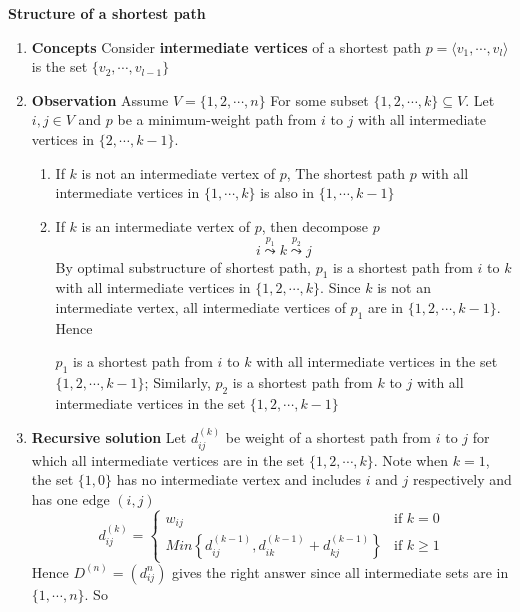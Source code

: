\documentclass[11pt]{article}
\begin{document}
\begin{defn*}
    \textbf{Structure of a shortest path} 
    \begin{enumerate}
        \item \textbf{Concepts} Consider \textbf{intermediate vertices} of a shortest path $p = \langle v_1, \cdots, v_l \rangle$ is the set $\{ v_2,\cdots, v_{l-1}\}$
        \item \textbf{Observation} Assume $V = \{ 1, 2, \cdots, n\}$ For some subset $\{ 1, 2, \cdots, k\}\subseteq V$. Let $i,j \in V$ and $p$ be a minimum-weight path from $i$ to $j$ with all intermediate vertices in $\{ 2, \cdots, k-1\}$. 
        \begin{enumerate}
            \item If $k$ is not an intermediate vertex of $p$, The shortest path $p$ with all intermediate vertices in $\{ 1, \cdots, k\}$ is also in $\{ 1, \cdots, k-1\}$
            \item If $k$ is an intermediate vertex of $p$, then decompose $p$
            \[
                i\overset{p_1}{\leadsto} k \overset{p_2}{\leadsto} j
            \]
            By optimal substructure of shortest path, $p_1$ is a shortest path from $i$ to $k$ with all intermediate vertices in $\{ 1, 2, \cdots, k \}$. Since $k$ is not an intermediate vertex, all intermediate vertices of $p_1$ are in $\{1,2,\cdots, k-1  \}$. Hence 
            \begin{center}
                $p_1$ is a shortest path from $i$ to $k$ with all intermediate vertices in the set $\{ 1,2,\cdots, k-1 \}$; Similarly, $p_2$ is a shortest path from $k$ to $j$ with all intermediate vertices in the set $\{ 1,2,\cdots, k-1 \}$
            \end{center}
        \end{enumerate}
        \item \textbf{Recursive solution} Let $d_{ij}^{(k)}$ be weight of a shortest path from $i$ to $j$ for which all intermediate vertices are in the set $\{1,2,\cdots, k \}$. Note when $k=1$, the set $\{ 1, 0 \}$ has no intermediate vertex and includes $i$ and $j$ respectively and has one edge $(i,j)$
        \[
            d_{ij}^{(k)} = 
            \begin{cases}
                w_{ij}  & \text{if } k = 0\\
                Min\left\{d_{ij}^{(k-1)}, d_{ik}^{(k-1)} + d_{kj}^{(k-1)}\right\} & \text{if } k\geq 1  
            \end{cases}
        \]
        Hence $D^{(n)} = (d_{ij}^{n})$ gives the right answer since all intermediate sets are in $\{1,\cdots,n \}$. So 

\end{enumerate}
\end{defn*}
\end{document}
